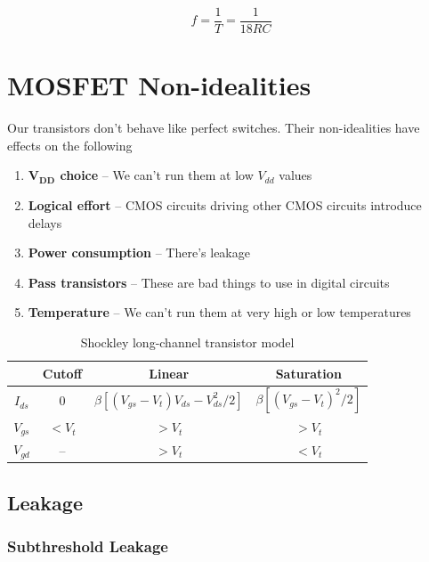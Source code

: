 \documentclass{article}
\begin{document}
$$f = \dfrac{1}{T} = \dfrac{1}{18RC}$$

\section{MOSFET Non-idealities}

Our transistors don't behave like perfect switches. Their non-idealities have effects on the following

\begin{enumerate}
\item \textbf{$\mathbf{V_{DD}}$ choice} -- We can't run them at low $V_{dd}$ values

\item \textbf{Logical effort} -- CMOS circuits driving other CMOS circuits introduce delays

\item \textbf{Power consumption} -- There's leakage 

\item \textbf{Pass transistors} -- These are bad things to use in digital circuits

\item \textbf{Temperature} -- We can't run them at very high or low temperatures
\end{enumerate}

\begin{table}
\centering
\begin{tabular}{cccc}
\toprule
& \textbf{Cutoff}  & \textbf{Linear} & \textbf{Saturation} \\
\midrule
$I_{ds}$ & 0 & $\beta\left[ ( V_{gs} - V_t )V_{ds} - V_{ds}^2/2\right]$  & $\beta\left[ ( V_{gs} - V_t )^2/2\right]$  \\
$V_{gs}$ & $<V_{t}$ & $>V_{t}$ & $>V_{t}$ \\
$V_{gd}$ & -- & $>V_{t}$ & $<V_{t}$ \\
\toprule
\end{tabular}
\caption{Shockley long-channel transistor model}
\end{table}

\subsection{Leakage}

\subsubsection{Subthreshold Leakage}
\end{document}
